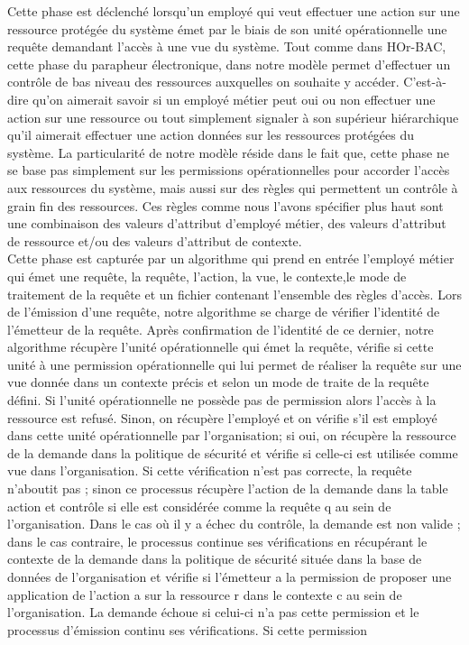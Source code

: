 
\label{sectionPhaseEmission}


Cette phase est déclenché lorsqu'un employé qui veut effectuer une action sur une ressource protégée du système émet par le biais de son unité opérationnelle une requête demandant l'accès à une vue du système. Tout comme dans HOr-BAC, cette phase du parapheur électronique, dans notre modèle permet d'effectuer un contrôle de bas niveau des ressources auxquelles on souhaite y accéder. C'est-à-dire qu'on aimerait savoir si un employé métier peut oui ou non effectuer une action sur une ressource ou tout simplement signaler à son supérieur hiérarchique qu'il aimerait effectuer une action données sur les ressources protégées du système. La particularité de notre modèle réside dans le fait que, cette phase ne se base pas simplement sur les permissions opérationnelles pour accorder l'accès aux ressources du système, mais aussi sur des règles qui permettent un contrôle à grain fin des ressources. Ces règles comme nous l'avons spécifier plus haut sont une combinaison des valeurs d'attribut d'employé métier, des valeurs d'attribut de ressource et/ou des valeurs d'attribut de contexte. \\
\hspace*{0.5cm} Cette phase est capturée par un algorithme qui prend en entrée l'employé métier qui émet une requête, la requête, l'action, la vue, le contexte,le mode de traitement de la requête et un fichier contenant l'ensemble des règles d'accès. Lors de l'émission d'une requête, notre algorithme se charge de vérifier l'identité de l'émetteur de la requête. Après confirmation de l'identité de ce dernier, notre algorithme récupère l'unité opérationnelle qui émet la requête, vérifie si cette unité à une permission opérationnelle qui lui permet de réaliser la requête sur une vue donnée dans un contexte précis et selon un mode de traite de la requête défini. Si l'unité opérationnelle ne possède pas de permission alors l'accès à la ressource est refusé. Sinon, on récupère l'employé et on vérifie s'il est employé dans cette unité opérationnelle par l'organisation; si oui, on récupère la ressource de la demande dans la politique de sécurité et vérifie si celle-ci est utilisée comme vue dans l'organisation. Si cette vérification n'est pas correcte, la requête n'aboutit pas ; sinon ce processus récupère l'action de la demande dans la table action et contrôle si elle est considérée comme la requête q au sein de l'organisation. Dans le cas où il y a échec du contrôle, la demande est non valide ; dans le cas contraire, le processus continue ses vérifications en récupérant le contexte de la demande dans la politique de sécurité située dans la base de données de l'organisation et vérifie si l'émetteur a la permission de proposer une application de l'action a sur la ressource r dans le contexte c au sein de l'organisation. La demande échoue si celui-ci n'a pas cette permission et le processus d'émission continu ses vérifications. Si cette permission
